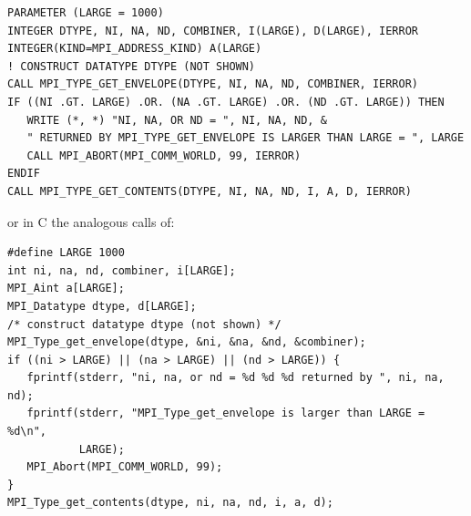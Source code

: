 \begin{lstlisting}[language={[MPI]Fortran}]
PARAMETER (LARGE = 1000)
INTEGER DTYPE, NI, NA, ND, COMBINER, I(LARGE), D(LARGE), IERROR
INTEGER(KIND=MPI_ADDRESS_KIND) A(LARGE)
! CONSTRUCT DATATYPE DTYPE (NOT SHOWN)
CALL MPI_TYPE_GET_ENVELOPE(DTYPE, NI, NA, ND, COMBINER, IERROR)
IF ((NI .GT. LARGE) .OR. (NA .GT. LARGE) .OR. (ND .GT. LARGE)) THEN
   WRITE (*, *) "NI, NA, OR ND = ", NI, NA, ND, &
   " RETURNED BY MPI_TYPE_GET_ENVELOPE IS LARGER THAN LARGE = ", LARGE
   CALL MPI_ABORT(MPI_COMM_WORLD, 99, IERROR)
ENDIF
CALL MPI_TYPE_GET_CONTENTS(DTYPE, NI, NA, ND, I, A, D, IERROR)
\end{lstlisting}

\noindent
or in C the analogous calls of:

\begin{lstlisting}[language={[MPI]C}]
#define LARGE 1000
int ni, na, nd, combiner, i[LARGE];
MPI_Aint a[LARGE];
MPI_Datatype dtype, d[LARGE];
/* construct datatype dtype (not shown) */
MPI_Type_get_envelope(dtype, &ni, &na, &nd, &combiner);
if ((ni > LARGE) || (na > LARGE) || (nd > LARGE)) {
   fprintf(stderr, "ni, na, or nd = %d %d %d returned by ", ni, na, nd);
   fprintf(stderr, "MPI_Type_get_envelope is larger than LARGE = %d\n",
           LARGE);
   MPI_Abort(MPI_COMM_WORLD, 99);
}
MPI_Type_get_contents(dtype, ni, na, nd, i, a, d);
\end{lstlisting}

